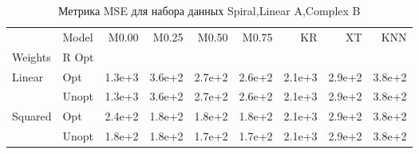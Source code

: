 \begin{table}
\caption{Метрика MSE для набора данных Spiral,Linear A,Complex B}
\label{tab:MSE_Spiral,Linear A,Complex B}
\begin{tabular}{llrrrrrrr}
\toprule
 & Model & M0.00 & M0.25 & M0.50 & M0.75 & KR & XT & KNN \\
Weights & R Opt &  &  &  &  &  &  &  \\
\midrule
\multirow[t]{2}{*}{Linear} & Opt & 1.3e+3 & 3.6e+2 & 2.7e+2 & 2.6e+2 & 2.1e+3 & 2.9e+2 & 3.8e+2 \\
 & Unopt & 1.3e+3 & 3.6e+2 & 2.7e+2 & 2.6e+2 & 2.1e+3 & 2.9e+2 & 3.8e+2 \\

\multirow[t]{2}{*}{Squared} & Opt & 2.4e+2 & 1.8e+2 & 1.8e+2 & 1.8e+2 & 2.1e+3 & 2.9e+2 & 3.8e+2 \\
 & Unopt & 1.8e+2 & 1.8e+2 & 1.7e+2 & 1.7e+2 & 2.1e+3 & 2.9e+2 & 3.8e+2 \\

\bottomrule
\end{tabular}
\end{table}
